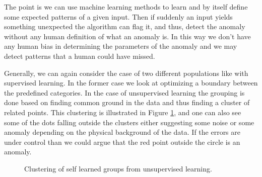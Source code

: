 \documentclass[12pt,a4paper]{article} %
\numberwithin{equation}{section}
\begin{document}
			The point is we can use machine learning methods to learn and by itself define some expected patterns of a given input. Then if suddenly an input yields something unexpected the algorithm can flag it, and thus, detect the anomaly without any human definition of what an anomaly is. In this way we don't have any human bias in determining the parameters of the anomaly and we may detect patterns that a human could have missed. 
			
			Generally, we can again consider the case of two different populations like with supervised learning. In the former case we look at optimizing a boundary between the predefined categories. In the case of unsupervised learning the grouping is done based on finding common ground in the data and thus finding a cluster of related points. This clustering is illustrated in Figure \ref{fig:unsupervised}, and one can also see some of the dots falling outside the clusters either suggesting some noise or some anomaly depending on the physical background of the data. If the errors are under control than we could argue that the red point outside the circle is an anomaly.
			
			\begin{figure}
				\centering
				\caption{Clustering of self learned groups from unsupervised learning.}
				\label{fig:unsupervised}
			\end{figure}
			
\end{document}
